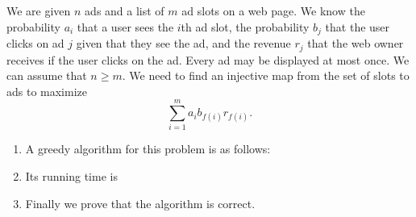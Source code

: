 \documentclass[11pt]{article}
\begin{document}
We are given $n$ ads and a list of $m$ ad slots on a web page. We know the probability $a_i$ that a user sees the $i$th ad slot, the probability $b_j$ that the user clicks on ad $j$ given that they see the ad, and the revenue $r_j$ that the web owner receives if the user clicks on the ad. Every ad may be displayed at most once. We can assume that $n \geq m$. We need to find an injective map from the set of slots to ads to maximize
\[\sum_{i=1}^m a_ib_{f(i)}r_{f(i)}. \]
\begin{enumerate}
\item A greedy algorithm for this problem is as follows:
\item Its running time is
\item Finally we prove that the algorithm is correct.
\end{enumerate}
\end{document}
